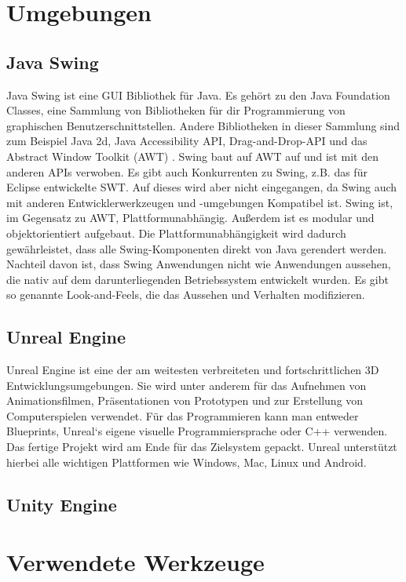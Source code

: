 \documentclass[
	12pt, %
	a4paper,
	listof=totoc, %
	bibliography=totoc, %
	numbers=noenddot, %
	ngerman, %
	headsepline, %
	oneside %
	]{scrbook} %
\begin{document}
\chapter{Umgebungen}\label{sec:Umgebungen}
\section{Java Swing}
Java Swing ist eine \gls{GUI} Bibliothek für Java. Es gehört zu den Java Foundation Classes, eine Sammlung von Bibliotheken für dir Programmierung von graphischen Benutzerschnittstellen. Andere Bibliotheken in dieser Sammlung sind zum Beispiel Java 2d, Java Accessibility API, Drag-and-Drop-API und das Abstract Window Toolkit (AWT) \cite{JFC}. Swing baut auf AWT auf und ist mit den anderen APIs verwoben.  
Es gibt auch Konkurrenten zu Swing, z.B. das für Eclipse entwickelte SWT. Auf dieses wird aber nicht eingegangen, da Swing auch mit anderen Entwicklerwerkzeugen und -umgebungen Kompatibel ist.  
Swing ist, im Gegensatz zu AWT, Plattformunabhängig. Außerdem ist es modular und objektorientiert aufgebaut. Die Plattformunabhängigkeit wird dadurch gewährleistet, dass alle Swing-Komponenten direkt von Java gerendert werden. Nachteil davon ist, dass Swing Anwendungen nicht wie Anwendungen aussehen, die nativ auf dem darunterliegenden Betriebssystem entwickelt wurden.  
Es gibt so genannte \glqq Look-and-Feels\grqq{}, die das Aussehen und Verhalten modifizieren.

\section{Unreal Engine}

Unreal Engine ist eine der am weitesten verbreiteten und fortschrittlichen 3D Entwicklungsumgebungen. Sie wird unter anderem für das Aufnehmen von Animationsfilmen, Präsentationen von Prototypen und zur Erstellung von Computerspielen verwendet.
Für das Programmieren kann man entweder Blueprints, Unreal`s eigene visuelle Programmiersprache oder C++ verwenden. Das fertige Projekt wird am Ende für das Zielsystem gepackt. Unreal unterstützt hierbei alle wichtigen Plattformen wie Windows, Mac, Linux und Android.


\section{Unity Engine}


\chapter{Verwendete Werkzeuge}
\end{document}

